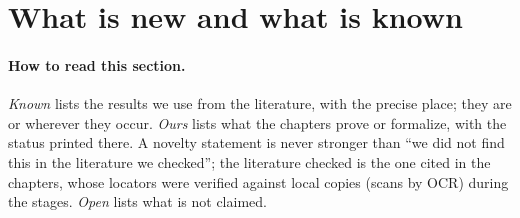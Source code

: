 \section{What is new and what is known}\label{ss:s00-newknown}

\paragraph{How to read this section.} \emph{Known} lists the results we use from the literature, with the precise place; they
are \stcited{} or \stknown{} wherever they occur. \emph{Ours} lists what the chapters prove or formalize, with the status printed
there. A novelty statement is never stronger than ``we did not find this in the literature we checked''; the literature checked
is the one cited in the chapters, whose locators were verified against local copies (scans by OCR) during the stages.
\emph{Open} lists what is not claimed.

